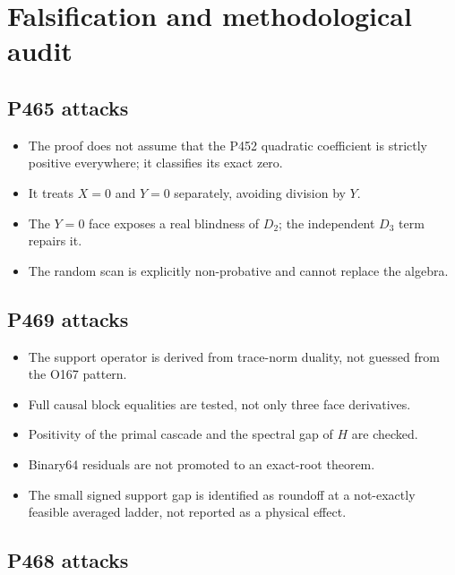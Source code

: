 \documentclass[11pt,a4paper,openany]{report}
\begin{document}
\chapter{Falsification and methodological audit}

\section{P465 attacks}

\begin{itemize}
\item 
The proof does not assume that the P452 quadratic coefficient is strictly positive everywhere; it classifies its exact zero.

\item 
It treats \(X=0\) and \(Y=0\) separately, avoiding division by \(Y\).

\item 
The \(Y=0\) face exposes a real blindness of \(D_2\); the independent \(D_3\) term repairs it.

\item 
The random scan is explicitly non-probative and cannot replace the algebra.

\end{itemize}

\section{P469 attacks}

\begin{itemize}
\item 
The support operator is derived from trace-norm duality, not guessed from the O167 pattern.

\item 
Full causal block equalities are tested, not only three face derivatives.

\item 
Positivity of the primal cascade and the spectral gap of \(H\) are checked.

\item 
Binary64 residuals are not promoted to an exact-root theorem.

\item 
The small signed support gap is identified as roundoff at a not-exactly feasible averaged ladder, not reported as a physical effect.

\end{itemize}

\section{P468 attacks}
\end{document}
